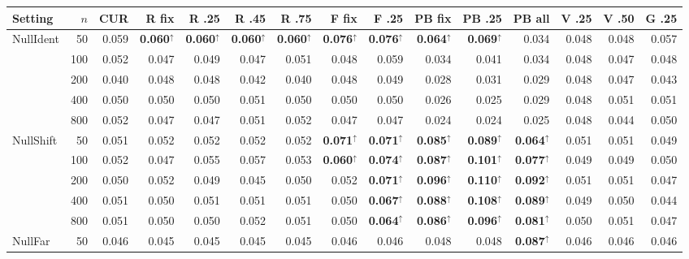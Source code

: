 \begin{tabular}{@{}lrrrrrrrrrrrrrr@{}}
\toprule
Setting & $n$ & CUR & R fix & R .25 & R .45 & R .75 & F fix & F .25 & PB fix & PB .25 & PB all & V .25 & V .50 & G .25\\
\midrule
NullIdent & 50 & 0.059 & \textbf{0.060}$^{\uparrow}$ & \textbf{0.060}$^{\uparrow}$ & \textbf{0.060}$^{\uparrow}$ & \textbf{0.060}$^{\uparrow}$ & \textbf{0.076}$^{\uparrow}$ & \textbf{0.076}$^{\uparrow}$ & \textbf{0.064}$^{\uparrow}$ & \textbf{0.069}$^{\uparrow}$ & 0.034 & 0.048 & 0.048 & 0.057\\
 & 100 & 0.052 & 0.047 & 0.049 & 0.047 & 0.051 & 0.048 & 0.059 & 0.034 & 0.041 & 0.034 & 0.048 & 0.047 & 0.048\\
 & 200 & 0.040 & 0.048 & 0.048 & 0.042 & 0.040 & 0.048 & 0.049 & 0.028 & 0.031 & 0.029 & 0.048 & 0.047 & 0.043\\
 & 400 & 0.050 & 0.050 & 0.050 & 0.051 & 0.050 & 0.050 & 0.050 & 0.026 & 0.025 & 0.029 & 0.048 & 0.051 & 0.051\\
 & 800 & 0.052 & 0.047 & 0.047 & 0.051 & 0.052 & 0.047 & 0.047 & 0.024 & 0.024 & 0.025 & 0.048 & 0.044 & 0.050\\
\addlinespace[2pt]
NullShift & 50 & 0.051 & 0.052 & 0.052 & 0.052 & 0.052 & \textbf{0.071}$^{\uparrow}$ & \textbf{0.071}$^{\uparrow}$ & \textbf{0.085}$^{\uparrow}$ & \textbf{0.089}$^{\uparrow}$ & \textbf{0.064}$^{\uparrow}$ & 0.051 & 0.051 & 0.049\\
 & 100 & 0.052 & 0.047 & 0.055 & 0.057 & 0.053 & \textbf{0.060}$^{\uparrow}$ & \textbf{0.074}$^{\uparrow}$ & \textbf{0.087}$^{\uparrow}$ & \textbf{0.101}$^{\uparrow}$ & \textbf{0.077}$^{\uparrow}$ & 0.049 & 0.049 & 0.050\\
 & 200 & 0.050 & 0.052 & 0.049 & 0.045 & 0.050 & 0.052 & \textbf{0.071}$^{\uparrow}$ & \textbf{0.096}$^{\uparrow}$ & \textbf{0.110}$^{\uparrow}$ & \textbf{0.092}$^{\uparrow}$ & 0.051 & 0.051 & 0.047\\
 & 400 & 0.051 & 0.050 & 0.051 & 0.051 & 0.051 & 0.050 & \textbf{0.067}$^{\uparrow}$ & \textbf{0.088}$^{\uparrow}$ & \textbf{0.108}$^{\uparrow}$ & \textbf{0.089}$^{\uparrow}$ & 0.049 & 0.050 & 0.044\\
 & 800 & 0.051 & 0.050 & 0.050 & 0.052 & 0.051 & 0.050 & \textbf{0.064}$^{\uparrow}$ & \textbf{0.086}$^{\uparrow}$ & \textbf{0.096}$^{\uparrow}$ & \textbf{0.081}$^{\uparrow}$ & 0.050 & 0.051 & 0.047\\
\addlinespace[2pt]
NullFar & 50 & 0.046 & 0.045 & 0.045 & 0.045 & 0.045 & 0.046 & 0.046 & 0.048 & 0.048 & \textbf{0.087}$^{\uparrow}$ & 0.046 & 0.046 & 0.046\\

\end{tabular}
